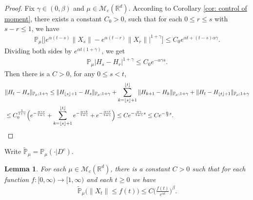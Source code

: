 \documentclass[12pt,oneside,english]{amsart}
\theoremstyle{plain}
\newtheorem{lem}[thm]{Lemma}
\theoremstyle{definition}
\numberwithin{equation}{section}
\newcommand{\added}[1]{{\color{blue}#1}}\newcommand{\deleted}[1]{{\color{red}#1}}
\begin{document}
\begin{proof}
     Fix $\gamma \in (0,\beta)$ and $\mu\in \mathcal M_c(\mathbb R^d)$.
   \added{ According to Corollary \ref{cor: control of moment}}, there exists a constant $C_0>0$, such that for each $0\leq r\leq s $ with $s-r\leq1$, we have
    \begin{align}
        \mathbb{P}_{\mu}\big[\big|e^{\alpha(t-s)}\|X_s\|-e^{\alpha(t-r)}\|X_r\|\big|^{1+\gamma}\big]
        \leq C_0e^{\alpha t+(t-s)\alpha\gamma}.
    \end{align}
    Dividing both sides by $e^{\alpha t(1+\gamma)}$, we get
    \begin{align}
        \mathbb{P}_{\mu}\left|H_s-H_r\right|^{1+\gamma}\leq  C_0 e^{-\alpha \gamma s}.
    \end{align}
    Then there is a $C>0$, for any $0\leq s<t$,
\begin{align}
	& \|H_t-H_s\|_{\mathbb{P}_{\mu};1+\gamma}
	\leq \|H_{\lfloor s \rfloor+1}-H_s\|_{\mathbb{P}_{\mu};1+\gamma}+\sum_{k=\lfloor s \rfloor+1}^{\lfloor t \rfloor}\|H_{k+1}-H_{k}\|_{\mathbb{P}_{\mu};1+\gamma}+\|H_t-H_{\lfloor t \rfloor+1}\|_{\mathbb{P}_{\mu};1+\gamma}
	\\& \leq C_0^{\frac{1}{1+\gamma}} \Big(e^{-\frac{\alpha \gamma s}{1+\gamma}}+\sum_{k=\lfloor s \rfloor+1}^{\lfloor t \rfloor}e^{-\frac{\alpha \gamma k}{1+\gamma}}+ e^{-\frac{\alpha \gamma t}{1+\gamma}}\Big)
	\leq Ce^{-\frac{\alpha \gamma}{1+\gamma}s}\leq Ce^{-\frac{\alpha}{2}s}.
    \qedhere
\end{align}	
\end{proof}

Write $\mathbb{\tilde{P}}_{\mu}=\mathbb{P}_{\mu}(\cdot|D^c)$.
\begin{lem}\label{lem: control of XT}
	For each $\mu\in \mathcal M_c(\mathbb R^d)$, there is a constant $C>0$ such that for each function $f:[0,\infty)\to [1,\infty)$ and each $t\geq 0$ we have
\begin{align}
    \mathbb{\tilde{P}}_{\mu}\big(\|X_t\|\leq f(t)\big)\leq C \Big(\frac{f(t)}{e^{\alpha t}}\Big)^{\beta}.
\end{align}
\end{lem}
\end{document}

